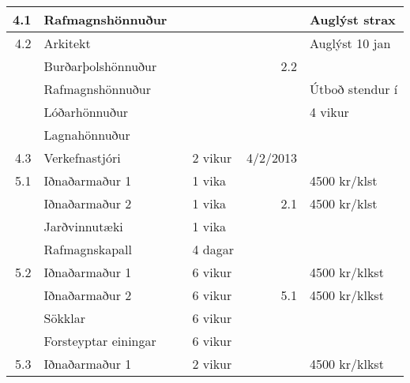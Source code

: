 \documentclass[11pt]{article}
\begin{document}
\begin{center}
\begin{tabular}{rlllrl}
\hline
        4.1  &  Rafmagnshönnuður      &           &            &                 &  Auglýst strax                     \\
\hline
        4.2  &  Arkitekt              &           &            &                 &  Auglýst 10 jan                    \\
             &  Burðarþolshönnuður    &           &            &            2.2  &                                    \\
             &  Rafmagnshönnuður      &           &            &                 &  Útboð stendur í                   \\
             &  Lóðarhönnuður         &           &            &                 &  4 vikur                           \\
             &  Lagnahönnuður         &           &            &                 &                                    \\
\hline
        4.3  &  Verkefnastjóri        &           &  2 vikur   &       4/2/2013  &                                    \\
\hline
        5.1  &  Iðnaðarmaður 1        &           &  1 vika    &                 &  4500 kr/klst                      \\
             &  Iðnaðarmaður 2        &           &  1 vika    &            2.1  &  4500 kr/klst                      \\
             &  Jarðvinnutæki         &           &  1 vika    &                 &                                    \\
             &  Rafmagnskapall        &           &  4 dagar   &                 &                                    \\
\hline
        5.2  &  Iðnaðarmaður 1        &           &  6 vikur   &                 &  4500 kr/klkst                     \\
             &  Iðnaðarmaður 2        &           &  6 vikur   &            5.1  &  4500 kr/klkst                     \\
             &  Sökklar               &           &  6 vikur   &                 &                                    \\
             &  Forsteyptar einingar  &           &  6 vikur   &                 &                                    \\
\hline
        5.3  &  Iðnaðarmaður 1        &           &  2 vikur   &                 &  4500 kr/klkst                     \\

\end{tabular}
\end{center}
\end{document}

